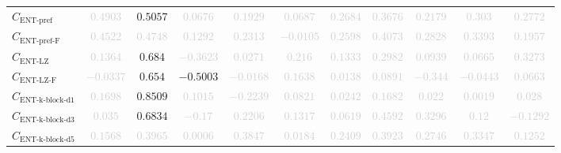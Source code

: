 \documentclass{standalone}
\newcommand{\entprefixname}{\text{ENT-pref}}
\newcommand{\entprefix}{C_{\entprefixname}}
\newcommand{\entprefixflatname}{\text{ENT-pref-F}}
\newcommand{\entprefixflat}{C_{\entprefixflatname}}
\newcommand{\entlempelzivname}{\text{ENT-LZ}}
\newcommand{\entlempelziv}{C_{\entlempelzivname}}
\newcommand{\entlempelzivflatname}{\text{ENT-LZ-F}}
\newcommand{\entlempelzivflat}{C_{\entlempelzivflatname}}
\newcommand{\entkblockdonename}{\text{ENT-k-block-d1}}
\newcommand{\entkblockdone}{C_{\entkblockdonename}}
\newcommand{\entkblockdthreename}{\text{ENT-k-block-d3}}
\newcommand{\entkblockdthree}{C_{\entkblockdthreename}}
\newcommand{\entkblockdfivename}{\text{ENT-k-block-d5}}
\newcommand{\entkblockdfive}{C_{\entkblockdfivename}}
\begin{document}
\begin{tabular}{lcccccccccc}
$\entprefix$ & \textcolor{lightgray}{$0.4903$} & $0.5057$ & \textcolor{lightgray}{$0.0676$} & \textcolor{lightgray}{$0.1929$} & \textcolor{lightgray}{$0.0687$} & \textcolor{lightgray}{$0.2684$} & \textcolor{lightgray}{$0.3676$} & \textcolor{lightgray}{$0.2179$} & \textcolor{lightgray}{$0.303$} & \textcolor{lightgray}{$0.2772$} \\ 
$\entprefixflat$ & \textcolor{lightgray}{$0.4522$} & \textcolor{lightgray}{$0.4748$} & \textcolor{lightgray}{$0.1292$} & \textcolor{lightgray}{$0.2313$} & \textcolor{lightgray}{$-0.0105$} & \textcolor{lightgray}{$0.2598$} & \textcolor{lightgray}{$0.4073$} & \textcolor{lightgray}{$0.2828$} & \textcolor{lightgray}{$0.3393$} & \textcolor{lightgray}{$0.1957$} \\ 
$\entlempelziv$ & \textcolor{lightgray}{$0.1364$} & $0.684$ & \textcolor{lightgray}{$-0.3623$} & \textcolor{lightgray}{$0.0271$} & \textcolor{lightgray}{$0.216$} & \textcolor{lightgray}{$0.1333$} & \textcolor{lightgray}{$0.2982$} & \textcolor{lightgray}{$0.0939$} & \textcolor{lightgray}{$0.0665$} & \textcolor{lightgray}{$0.3273$} \\ 
$\entlempelzivflat$ & \textcolor{lightgray}{$-0.0337$} & $0.654$ & $-0.5003$ & \textcolor{lightgray}{$-0.0168$} & \textcolor{lightgray}{$0.1638$} & \textcolor{lightgray}{$0.0138$} & \textcolor{lightgray}{$0.0891$} & \textcolor{lightgray}{$-0.344$} & \textcolor{lightgray}{$-0.0443$} & \textcolor{lightgray}{$0.0663$} \\ 
$\entkblockdone$ & \textcolor{lightgray}{$0.1698$} & $0.8509$ & \textcolor{lightgray}{$0.1015$} & \textcolor{lightgray}{$-0.2239$} & \textcolor{lightgray}{$0.0821$} & \textcolor{lightgray}{$0.0242$} & \textcolor{lightgray}{$0.1682$} & \textcolor{lightgray}{$0.022$} & \textcolor{lightgray}{$0.0019$} & \textcolor{lightgray}{$0.028$} \\ 
$\entkblockdthree$ & \textcolor{lightgray}{$0.035$} & $0.6834$ & \textcolor{lightgray}{$-0.17$} & \textcolor{lightgray}{$0.2206$} & \textcolor{lightgray}{$0.1317$} & \textcolor{lightgray}{$0.0619$} & \textcolor{lightgray}{$0.4592$} & \textcolor{lightgray}{$0.3296$} & \textcolor{lightgray}{$0.12$} & \textcolor{lightgray}{$-0.1292$} \\ 
$\entkblockdfive$ & \textcolor{lightgray}{$0.1568$} & \textcolor{lightgray}{$0.3965$} & \textcolor{lightgray}{$0.0006$} & \textcolor{lightgray}{$0.3847$} & \textcolor{lightgray}{$0.0184$} & \textcolor{lightgray}{$0.2409$} & \textcolor{lightgray}{$0.3923$} & \textcolor{lightgray}{$0.2746$} & \textcolor{lightgray}{$0.3347$} & \textcolor{lightgray}{$0.1252$} \\ 

\end{tabular}
\end{document}
